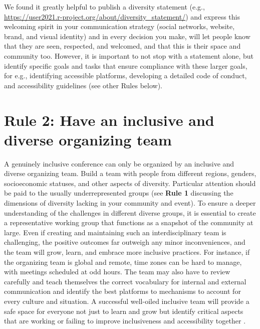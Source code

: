 \documentclass[10pt,letterpaper]{article}
\begin{document}
We found it greatly helpful to publish a diversity statement (e.g., \url{https://user2021.r-project.org/about/diversity_statement/}) and express this welcoming spirit in your communication strategy (social networks, website, brand, and visual identity) and in every decision you make, will let people know that they are seen, respected, and welcomed, and that this is their space and community too. However, it is important to not stop with a statement alone, but identify specific goals and tasks that ensure compliance with these larger goals, for e.g., identifying accessible platforms, developing a detailed code of conduct, and accessibility guidelines (see other Rules below).


\section*{Rule 2: Have an inclusive and diverse organizing team}
A genuinely inclusive conference can only be organized by an inclusive and diverse organizing team. Build a team with people from different regions, genders, socioeconomic statuses, and other aspects of diversity. Particular attention should be paid to the usually underrepresented groups (see \textbf{Rule 1} discussing the dimensions of diversity lacking in your community and event). To ensure a deeper understanding of the challenges in different diverse groups, it is essential to create a representative working group that functions as a snapshot of the community at large. Even if creating and maintaining such an interdisciplinary team is challenging, the positive outcomes far outweigh any minor inconveniences, and the team will grow, learn, and embrace more inclusive practices. For instance, if the organizing team is global and remote, time zones can be hard to manage, with meetings scheduled at odd hours. The team may also have to review carefully and teach themselves the correct vocabulary for internal and external communication and identify the best platforms to mechanisms to account for every culture and situation. 
A successful well-oiled inclusive team will provide a safe space for everyone not just to learn and grow but identify critical aspects that are working or failing to improve inclusiveness and accessibility together \cite{hong_groups_2004}.

\end{document}
